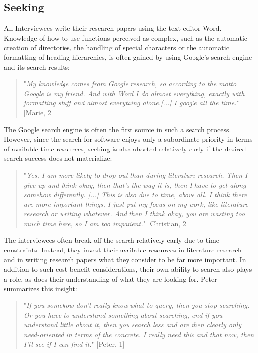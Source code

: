 \documentclass[12pt, a4paper, titlepage, oneside, abstract=true, toc=listof, toc=bibliography]{scrreprt}
\begin{document}
{%
\subsection{Seeking}
\label{sec:IP_Seeking}
All Interviewees write their research papers using the text editor Word. Knowledge of how to use functions perceived as complex, such as the automatic creation of directories, the handling of special characters or the automatic formatting of heading hierarchies, is often gained by using Google's search engine and its search results:

\begin{quotation}
"\textit{My knowledge comes from Google research, so according to the motto Google is my friend. And with Word I do almost everything, exactly with formatting stuff and almost everything alone.[...] I google all the time.}" [Marie, 2]
\end{quotation}

The Google search engine is often the first source in such a search process. However, since the search for software enjoys only a subordinate priority in terms of available time resources, seeking is also aborted relatively early if the desired search success does not materialize:

\begin{quotation}
"\textit{Yes, I am more likely to drop out than during literature research. Then I give up and think okay, then that's the way it is, then I have to get along somehow differently. [...] This is also due to time, above all. I think there are more important things, I just put my focus on my work, like literature research or writing whatever. And then I think okay, you are wasting too much time here, so I am too impatient.}" [Christian, 2]
\end{quotation}

The interviewees often break off the search relatively early due to time constraints. Instead, they invest their available resources in literature research and in writing research papers what they consider to be far more important. In addition to such cost-benefit considerations, their own ability to search also plays a role, as does their understanding of what they are looking for. Peter summarizes this insight:

\begin{quotation}
"\textit{If you somehow don't really know what to query, then you stop searching. Or you have to understand something about searching, and if you understand little about it, then you search less and are then clearly only need-oriented in terms of the concrete. I really need this and that now, then I'll see if I can find it.}" [Peter, 1]
\end{quotation}

}
\end{document}
